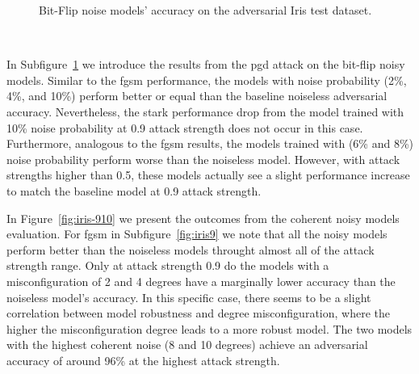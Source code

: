 \begin{figure}[!h]
\begin{subfigure}{0.45\textwidth}
      \label{fig:iris8}
  \end{subfigure}
  \caption{Bit-Flip noise models' accuracy on the adversarial Iris test dataset.}
  \label{fig:iris-78}
\end{figure} \

In Subfigure~\ref{fig:iris8} we introduce the results from the \ac{pgd}
attack on the bit-flip noisy models. Similar to the \ac{fgsm} performance,
the models with noise probability (2\%, 4\%, and 10\%) perform better or equal
than the baseline noiseless adversarial accuracy. Nevertheless, the stark
performance drop from the model trained with 10\% noise probability
at 0.9 attack strength does not occur in this case. Furthermore, analogous
to the \ac{fgsm} results, the models trained with (6\% and 8\%) noise
probability perform worse than the noiseless model. However, with attack
strengths higher than 0.5, these models actually see a slight performance
increase to match the baseline model at 0.9 attack strength. \

In Figure~\ref{fig:iris-910} we present the outcomes from the coherent
noisy models evaluation. For \ac{fgsm} in Subfigure~\ref{fig:iris9}
we note that all the noisy models perform better than the noiseless
models throught almost all of the attack strength range. Only at 
attack strength 0.9 do the models with a misconfiguration of 2 and
4 degrees have a marginally lower accuracy than the noiseless model's
accuracy. In this specific case, there seems to be a slight correlation
between model robustness and degree misconfiguration, where the
higher the misconfiguration degree leads to a more robust model. The
two models with the highest coherent noise (8 and 10 degrees) achieve
an adversarial accuracy of around 96\% at the highest attack strength. \

